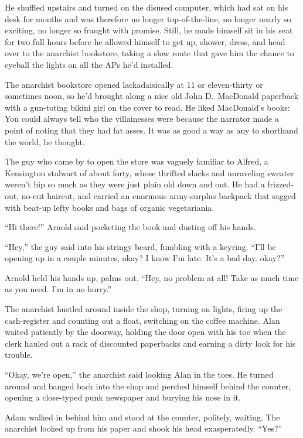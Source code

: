 He shuffled upstairs and turned on the disused computer, which had sat
on his desk for months and was therefore no longer top-of-the-line, no
longer nearly so exciting, no longer so fraught with promise.  Still,
he made himself sit in his seat for two full hours before he allowed
himself to get up, shower, dress, and head over to the anarchist
bookstore, taking a slow route that gave him the chance to eyeball the
lights on all the APs he'd installed.

The anarchist bookstore opened lackadaisically at 11 or eleven-thirty
or sometimes noon, so he'd brought along a nice old John D.\ MacDonald
paperback with a gun-toting bikini girl on the cover to read.  He
liked MacDonald's books:  You could always tell who the villainesses
were because the narrator made a point of noting that they had fat
asses.  It was as good a way as any to shorthand the world, he
thought.

The guy who came by to open the store was vaguely familiar to Alfred,
a Kensington stalwart of about forty, whose thrifted slacks and
unraveling sweater weren't hip so much as they were just plain old
down and out.  He had a frizzed-out, no-cut haircut, and carried an
enormous army-surplus backpack that sagged with beat-up lefty books
and bags of organic vegetariania.

``Hi there!'' Arnold said pocketing the book and dusting off his
hands.

``Hey,'' the guy said into his stringy beard, fumbling with a keyring. 
``I'll be opening up in a couple minutes, okay?  I know I'm late. 
It's a bad day.  okay?''

Arnold held his hands up, palms out.  ``Hey, no problem at all!  Take
as much time as you need.  I'm in no hurry.''

The anarchist hustled around inside the shop, turning on lights,
firing up the cash-register and counting out a float, switching on the
coffee machine.  Alan waited patiently by the doorway, holding the
door open with his toe when the clerk hauled out a rack of discounted
paperbacks and earning a dirty look for his trouble.

``Okay, we're open,'' the anarchist said looking Alan in the toes.  He
turned around and banged back into the shop and perched himself behind
the counter, opening a close-typed punk newspaper and burying his nose
in it.

Adam walked in behind him and stood at the counter, politely, waiting. 
The anarchist looked up from his paper and shook his head
exasperatedly.  ``Yes?''

